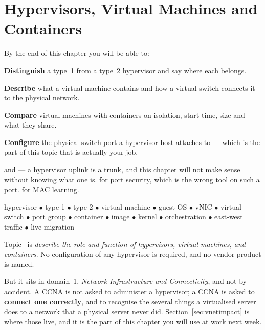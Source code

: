 \chapter{Hypervisors, Virtual Machines and Containers}\label{ch:virtualisation}

\begin{outcomes}
By the end of this chapter you will be able to:
\begin{tight}
  \item \textbf{Distinguish} a type~1 from a type~2 hypervisor and say where each
        belongs.
  \item \textbf{Describe} what a virtual machine contains and how a virtual
        switch connects it to the physical network.
  \item \textbf{Compare} virtual machines with containers on isolation, start
        time, size and what they share.
  \item \textbf{Configure} the physical switch port a hypervisor host attaches to
        --- which is the part of this topic that is actually your job.
\end{tight}
\end{outcomes}

\begin{prereq}
 and  --- a hypervisor uplink is a trunk, and this
chapter will not make sense without knowing what one is.  for
port security, which is the wrong tool on such a port.  for MAC
learning.
\end{prereq}

\begin{keyterms}
hypervisor $\bullet$ type 1 $\bullet$ type 2 $\bullet$ virtual machine $\bullet$
guest OS $\bullet$ vNIC $\bullet$ virtual switch $\bullet$ port group $\bullet$
container $\bullet$ image $\bullet$ kernel $\bullet$ orchestration $\bullet$
east-west traffic $\bullet$ live migration
\end{keyterms}

\begin{examnote}
Topic~ is \emph{describe the role and function of hypervisors, virtual
machines, and containers}. No configuration of any hypervisor is required, and no
vendor product is named.

But it sits in domain~1, \emph{Network Infrastructure and Connectivity}, and not
by accident. A CCNA is not asked to administer a hypervisor; a CCNA is asked to
\textbf{connect one correctly}, and to recognise the several things a virtualised
server does to a network that a physical server never did. Section~\ref{sec:vnetimpact} is where
those live, and it is the part of this chapter you will use at work next week.
\end{examnote}

